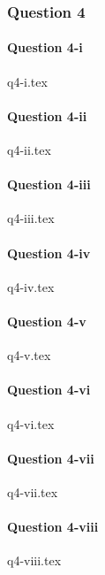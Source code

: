 \documentclass[crop=false,fleqn]{standalone}
\begin{document}
    \subsubsection{Question 4}
    
    \paragraph{Question 4-i}
    {q4-i.tex}

    \paragraph{Question 4-ii}
    {q4-ii.tex}

    \paragraph{Question 4-iii}
    {q4-iii.tex}

    \paragraph{Question 4-iv}
    {q4-iv.tex}

    \paragraph{Question 4-v}
    {q4-v.tex}

    \paragraph{Question 4-vi}
    {q4-vi.tex}

    \paragraph{Question 4-vii}
    {q4-vii.tex}

    \paragraph{Question 4-viii}
    {q4-viii.tex}
\end{document}
